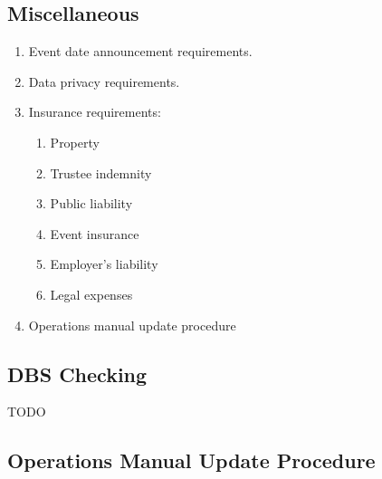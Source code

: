 \begin{draft}
\chapter{Miscellaneous}
\begin{enumerate}
\item Event date announcement requirements.
\item Data privacy requirements.
\item Insurance requirements:
  \begin{enumerate}
  \item Property
  \item Trustee indemnity
  \item Public liability
  \item Event insurance
  \item Employer's liability
  \item Legal expenses
  \end{enumerate}
\item Operations manual update procedure
\end{enumerate}

\section{DBS Checking}
\label{sec:dbs-checking}

TODO
\end{draft}

\section{Operations Manual Update Procedure}
\label{sec:ops-man-update-procedure}

